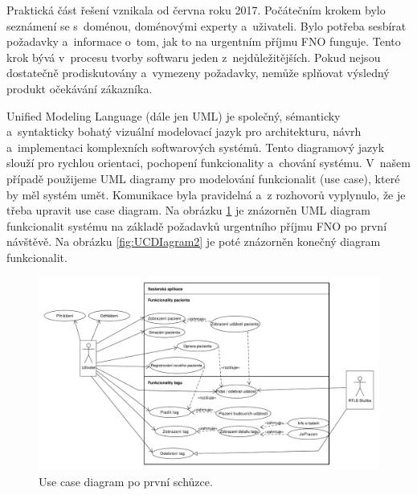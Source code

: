 Praktická část řešení vznikala od června roku 2017. Počátečním krokem bylo seznámení se s~doménou, doménovými experty a~uživateli. Bylo potřeba sesbírat požadavky a~informace o~tom, jak to na urgentním příjmu FNO funguje. Tento krok bývá v~procesu tvorby softwaru jeden z~nejdůležitějších. Pokud nejsou dostatečně prodiskutovány a~vymezeny požadavky, nemůže splňovat výsledný produkt očekávání zákazníka. \\


Unified Modeling Language (dále jen UML) je společný, sémanticky a~syntakticky bohatý vizuální modelovací jazyk pro architekturu, návrh a~implementaci komplexních softwarových systémů. Tento diagramový jazyk slouží pro rychlou orientaci, pochopení funkcionality a~chování systému. V~našem případě použijeme UML diagramy pro modelování funkcionalit (use case), které by měl systém umět. Komunikace byla pravidelná a~z rozhovorů vyplynulo, že je třeba upravit use case diagram. Na obrázku \ref{fig:UCDiagram1} je znázorněn UML diagram funkcionalit systému na základě požadavků urgentního příjmu FNO po první návštěvě. Na obrázku \ref{fig:UCDIagram2} je poté znázorněn konečný diagram funkcionalit.\cite{22}\\

\begin{figure} [H]
	\centering
	\includegraphics[width=15cm]{../UCDiagram1.pdf}
	\caption{Use case diagram po první schůzce.}
	\label{fig:UCDiagram1}
\end{figure}

